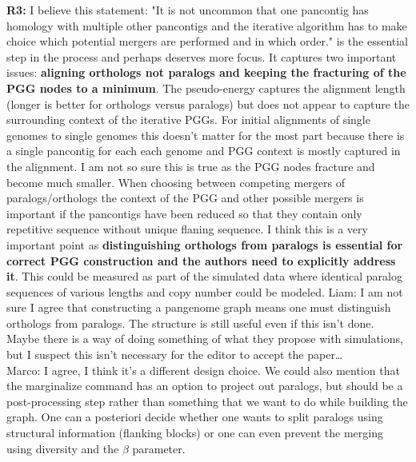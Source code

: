 \documentclass[aps,rmp,onecolumn]{revtex4-1}
\newcommand{\Marco}[1]{{\color{gray}Marco: #1}}
\newcommand{\Liam}[1]{{\color{teal}Liam: #1}}
\newcommand{\reviewer}[2]{\textbf{#1:} #2\vskip 5mm}
\begin{document}
\reviewer{R3}{I believe this statement: "It is not uncommon that one pancontig has homology with multiple other pancontigs and the iterative algorithm has to make choice which potential mergers are performed and in which order." is the essential step in the process and perhaps deserves more focus. It captures two important issues: \textbf{aligning orthologs not paralogs and keeping the fracturing of the PGG nodes to a minimum}. The pseudo-energy captures the alignment length (longer is better for orthologs versus paralogs) but does not appear to capture the surrounding context of the iterative PGGs. For initial alignments of single genomes to single genomes this doesn't matter for the most part because there is a single pancontig for each each genome and PGG context is mostly captured in the alignment. I am not so sure this is true as the PGG nodes fracture and become much smaller. When choosing between competing mergers of paralogs/orthologs the context of the PGG and other possible mergers is important if the pancontigs have been reduced so that they contain only repetitive sequence without unique flaning sequence. I think this is a very important point as \textbf{distinguishing orthologs from paralogs is essential for correct PGG construction and the authors need to explicitly address it}. This could be measured as part of the simulated data where identical paralog sequences of various lengths and copy number could be modeled.}
\Liam{I am not sure I agree that constructing a pangenome graph means one must distinguish orthologs from paralogs. The structure is still useful even if this isn't done. Maybe there is a way of doing something of what they propose with simulations, but I suspect this isn't necessary for the editor to accept the paper\ldots}\\
\Marco{I agree, I think it's a different design choice. We could also mention that the marginalize command has an option to project out paralogs, but should be a post-processing step rather than something that we want to do while building the graph. One can a posteriori decide whether one wants to split paralogs using structural information (flanking blocks) or one can even prevent the merging using diversity and the $\beta$ parameter.}\\
\end{document}
